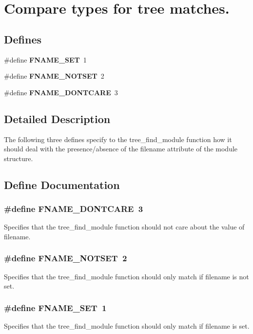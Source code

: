 \section{Compare types for tree matches.}
\label{group__tree__fname__comps}
\subsection*{Defines}
\begin{CompactItemize}
\item 
\#define {\bf FNAME\_\-SET}\ 1
\item 
\#define {\bf FNAME\_\-NOTSET}\ 2
\item 
\#define {\bf FNAME\_\-DONTCARE}\ 3
\end{CompactItemize}


\subsection{Detailed Description}
The following three defines specify to the tree\_\-find\_\-module function how it should deal with the presence/absence of the filename attribute of the module structure. 

\subsection{Define Documentation}
\subsubsection{\setlength{\rightskip}{0pt plus 5cm}\#define FNAME\_\-DONTCARE\ 3}\label{group__tree__fname__comps_a2}


Specifies that the tree\_\-find\_\-module function should not care about the value of filename. 
\subsubsection{\setlength{\rightskip}{0pt plus 5cm}\#define FNAME\_\-NOTSET\ 2}\label{group__tree__fname__comps_a1}


Specifies that the tree\_\-find\_\-module function should only match if filename is not set. 
\subsubsection{\setlength{\rightskip}{0pt plus 5cm}\#define FNAME\_\-SET\ 1}\label{group__tree__fname__comps_a0}


Specifies that the tree\_\-find\_\-module function should only match if filename is set. 